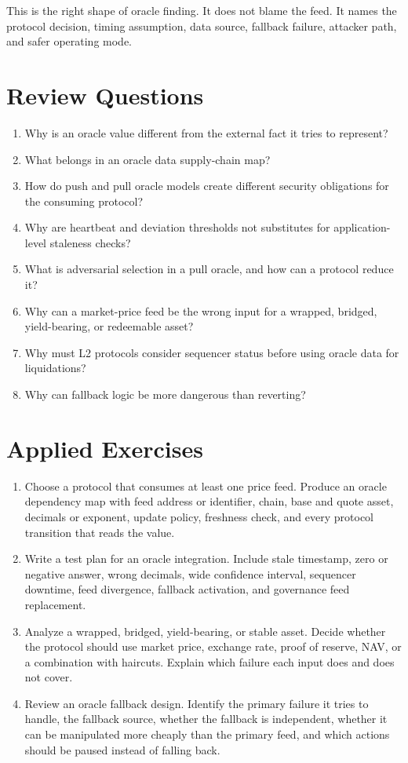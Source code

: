 This is the right shape of oracle finding. It does not blame the feed. It names the protocol decision, timing assumption, data source, fallback failure, attacker path, and safer operating mode.

\section*{Review Questions}

\begin{enumerate}
\item Why is an oracle value different from the external fact it tries to represent?
\item What belongs in an oracle data supply-chain map?
\item How do push and pull oracle models create different security obligations for the consuming protocol?
\item Why are heartbeat and deviation thresholds not substitutes for application-level staleness checks?
\item What is adversarial selection in a pull oracle, and how can a protocol reduce it?
\item Why can a market-price feed be the wrong input for a wrapped, bridged, yield-bearing, or redeemable asset?
\item Why must L2 protocols consider sequencer status before using oracle data for liquidations?
\item Why can fallback logic be more dangerous than reverting?
\end{enumerate}

\section*{Applied Exercises}

\begin{enumerate}
\item Choose a protocol that consumes at least one price feed. Produce an oracle dependency map with feed address or identifier, chain, base and quote asset, decimals or exponent, update policy, freshness check, and every protocol transition that reads the value.

\item Write a test plan for an oracle integration. Include stale timestamp, zero or negative answer, wrong decimals, wide confidence interval, sequencer downtime, feed divergence, fallback activation, and governance feed replacement.

\item Analyze a wrapped, bridged, yield-bearing, or stable asset. Decide whether the protocol should use market price, exchange rate, proof of reserve, NAV, or a combination with haircuts. Explain which failure each input does and does not cover.

\item Review an oracle fallback design. Identify the primary failure it tries to handle, the fallback source, whether the fallback is independent, whether it can be manipulated more cheaply than the primary feed, and which actions should be paused instead of falling back.
\end{enumerate}
